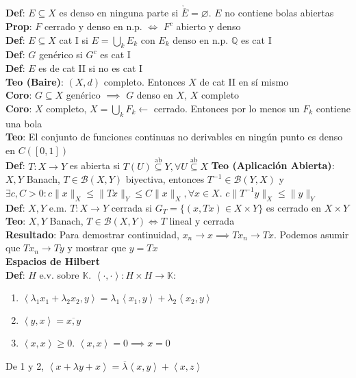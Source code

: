 \documentclass[9pt]{extarticle}
\newcommand{\K}{\mathbb{K}}
\newcommand{\Q}{\mathbb{Q}}
\newcommand{\inn}[1]{\left\langle #1\right\rangle}
\begin{document}
\begin{multicols*}{2}
\textbf{Def}: $E\subseteq X$ es denso en ninguna parte si $\mathring{\overline{E}}=\varnothing$. $E$ no contiene bolas abiertas\\
\textbf{Prop}: $F$ cerrado y denso en n.p. $\iff$ $F^c$ abierto y denso\\
\textbf{Def}: $E\subseteq X$ cat I si $E=\bigcup_k E_k$ con $E_k$ denso en n.p. $\Q$ es cat I\\
\textbf{Def}: $G$ genérico si $G^c$ es cat I\\
\textbf{Def}: $E$ es de cat II si no es cat I\\
\textbf{Teo (Baire)}: $(X,d)$ completo. Entonces $X$ de cat II en sí mismo\\
\textbf{Coro}: $G\subseteq X$ genérico $\implies$ $G$ denso en $X$, $X$ completo\\
\textbf{Coro}: $X$ completo, $X=\bigcup_k F_k\leftarrow$ cerrado. Entonces por lo menos un $F_k$ contiene una bola\\
\textbf{Teo}: El conjunto de funciones continuas no derivables en ningún punto es denso en $C([0,1])$\\
\textbf{Def}: $T:X\to Y$ es abierta si $T(U)\overset{\text{ab}}{\subseteq}Y,\forall U\overset{\text{ab}}{\subseteq} X$
\textbf{Teo (Aplicación Abierta)}: $X,Y$ Banach, $T\in \mathcal{B}(X,Y)$ biyectiva, entonces $T^{-1}\in \mathcal{B}(Y,X)$ y $\exists c,C>0:c\|x\|_X\leq \|Tx\|_Y\leq C\|x\|_X,\forall x\in X$. $c\|T^{-1}y\|_X\leq \|y\|_Y$\\
\textbf{Def}: $X,Y$ e.m. $T:X\to Y$ cerrada si $G_T=\{(x,Tx)\in X\times Y\}$ es cerrado en $X\times Y$\\
\textbf{Teo}: $X,Y$ Banach, $T\in\mathcal{B}(X,Y)\iff T$ lineal y cerrada\\
\textbf{Resultado}: Para demostrar continuidad, $x_n\to x\implies Tx_n\to Tx$. Podemos asumir que $Tx_n\to Ty$ y mostrar que $y=Tx$\\
\large\textbf{Espacios de Hilbert}\\\normalsize
\textbf{Def}: $H$ e.v. sobre $\K$. $\inn{\cdot,\cdot}:H\times H\to \K$:
\begin{enumerate}
	\item $\inn{\lambda_1x_1+\lambda_2x_2,y}=\lambda_1\inn{x_1,y}+\lambda_2\inn{x_2,y}$
	\item $\inn{y,x}=\overline{x,y}$
	\item $\inn{x,x}\geq 0$. $\inn{x,x}=0\implies x=0$
\end{enumerate}
De 1 y 2, $\inn{x+\lambda y+x}=\overline{\lambda}\inn{x,y}+\inn{x,z}$\\

\end{multicols*}
\end{document}
